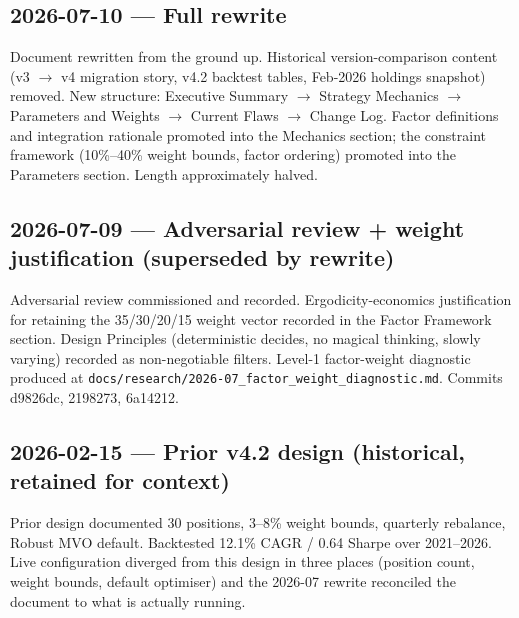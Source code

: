 \documentclass[11pt,a4paper]{article}
\begin{document}
\subsection*{2026-07-10 --- Full rewrite}

Document rewritten from the ground up. Historical version-comparison content (v3 $\rightarrow$ v4 migration story, v4.2 backtest tables, Feb-2026 holdings snapshot) removed. New structure: Executive Summary $\rightarrow$ Strategy Mechanics $\rightarrow$ Parameters and Weights $\rightarrow$ Current Flaws $\rightarrow$ Change Log. Factor definitions and integration rationale promoted into the Mechanics section; the constraint framework (10\%--40\% weight bounds, factor ordering) promoted into the Parameters section. Length approximately halved.

\subsection*{2026-07-09 --- Adversarial review + weight justification (superseded by rewrite)}

Adversarial review commissioned and recorded. Ergodicity-economics justification for retaining the 35/30/20/15 weight vector recorded in the Factor Framework section. Design Principles (deterministic decides, no magical thinking, slowly varying) recorded as non-negotiable filters. Level-1 factor-weight diagnostic produced at \texttt{docs/research/2026-07\_factor\_weight\_diagnostic.md}. Commits d9826dc, 2198273, 6a14212.

\subsection*{2026-02-15 --- Prior v4.2 design (historical, retained for context)}

Prior design documented 30 positions, 3--8\% weight bounds, quarterly rebalance, Robust MVO default. Backtested 12.1\% CAGR / 0.64 Sharpe over 2021--2026. Live configuration diverged from this design in three places (position count, weight bounds, default optimiser) and the 2026-07 rewrite reconciled the document to what is actually running.
\end{document}
